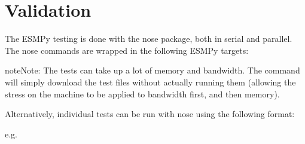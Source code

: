 \documentclass[letterpaper,10pt,english]{sphinxmanual}
\begin{document}
\section{Validation}
\label{\detokenize{install:validation}}
The ESMPy testing is done with the nose package, both in serial and
parallel.  The nose commands are wrapped in the following ESMPy targets:

\begin{sphinxVerbatim}[commandchars=\\\{\}]
  

  

  

  

  

  
\end{sphinxVerbatim}

\begin{sphinxadmonition}{note}{Note:}
The  tests can take up a lot of memory and bandwidth.
The  command will simply download the test
files without actually running them (allowing the stress on the machine to
be applied to bandwidth first, and then memory).
\end{sphinxadmonition}

Alternatively, individual tests can be run with nose using the following format:

\begin{sphinxVerbatim}[commandchars=\\\{\}]
 
\end{sphinxVerbatim}

e.g.

\begin{sphinxVerbatim}[commandchars=\\\{\}]
 
\end{sphinxVerbatim}
\end{document}
